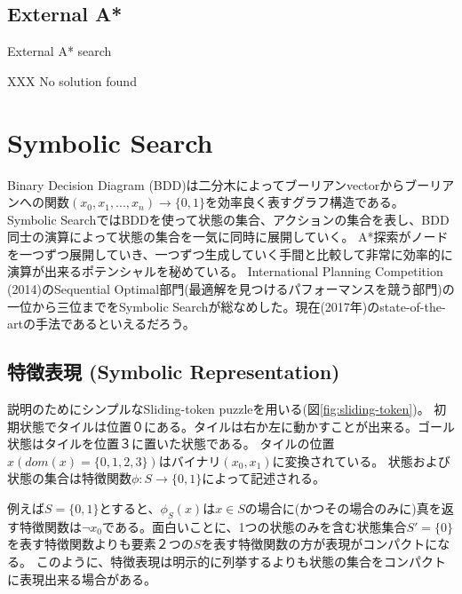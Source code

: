 \documentclass[b5paper]{report}
\begin{document}
\subsection{External A*}
\label{sec:external-astar}



\begin{algorithm}
\caption{External A* search}
\label{alg:external-astar}
	
	XXX
	\Return No solution found
\end{algorithm}


\section{Symbolic Search}
\label{sec:symbolic-search}
Binary Decision Diagram (BDD)は二分木によってブーリアンvectorからブーリアンへの関数$(x_0,x_1,...,x_n) \rightarrow \{0, 1\}$を効率良く表すグラフ構造である。
Symbolic SearchではBDDを使って状態の集合、アクションの集合を表し、BDD同士の演算によって状態の集合を一気に同時に展開していく。
A*探索がノードを一つずつ展開していき、一つずつ生成していく手間と比較して非常に効率的に演算が出来るポテンシャルを秘めている。
International Planning Competition (2014)のSequential Optimal部門(最適解を見つけるパフォーマンスを競う部門)の一位から三位までをSymbolic Searchが総なめした。現在(2017年)のstate-of-the-artの手法であるといえるだろう。


\subsection{特徴表現 (Symbolic Representation)}
\label{sec:symbolic-representation}

説明のためにシンプルなSliding-token puzzleを用いる(図\ref{fig:sliding-token})。
初期状態でタイルは位置０にある。タイルは右か左に動かすことが出来る。ゴール状態はタイルを位置３に置いた状態である。
タイルの位置$x (dom(x) = \{0,1,2,3\})$はバイナリ$(x_0,x_1)$に変換されている。
状態および状態の集合は特徴関数$\phi: S \rightarrow \{0, 1\}$によって記述される。



例えば$S = \{0, 1\}$とすると、$\phi_{S}(x)$は$x \in S$の場合に(かつその場合のみに)真を返す特徴関数は$\lnot x_0$である。面白いことに、1つの状態のみを含む状態集合$S' = \{0\}$を表す特徴関数よりも要素２つの$S$を表す特徴関数の方が表現がコンパクトになる。
このように、特徴表現は明示的に列挙するよりも状態の集合をコンパクトに表現出来る場合がある。
\end{document}
